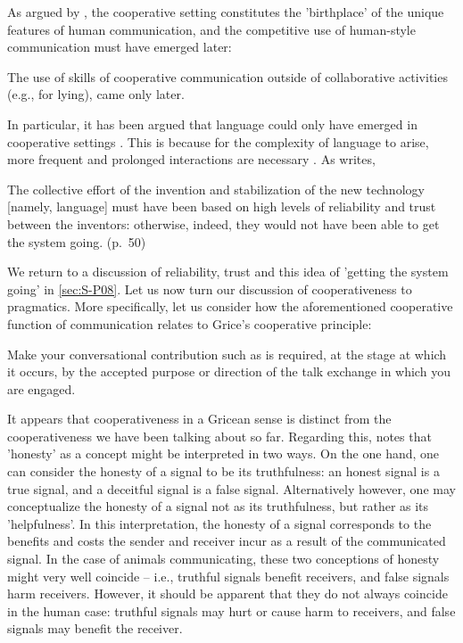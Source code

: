 As argued by \citet{Tomasello08, Tomasello09}, the cooperative setting constitutes the 'birthplace' of the unique features of human communication, and the competitive use of human-style communication must have emerged later:
\begin{quoting}
    The use of skills of cooperative communication outside of collaborative activities (e.g., for lying), came only later.
    \\ \hspace*{\fill} \citep[p.~325]{Tomasello08}
\end{quoting}
In particular, it has been argued that language could only have emerged in cooperative settings \citep{Tomasello08, Dor17}.
This is because for the complexity of language to arise, more frequent and prolonged interactions are necessary \citep{Benitez21}. As \citet{Dor17} writes,
\begin{quoting}
    The collective effort of the invention and stabilization of the new technology [namely, language] must have been based on high levels of reliability and trust between the inventors: otherwise, indeed, they would not have been able to get the system going.
    \hfill (p.~50)
\end{quoting}
We return to a discussion of reliability, trust and this idea of 'getting the system going' in \cref{sec:S-P08}.
Let us now turn our discussion of cooperativeness to pragmatics. More specifically, let us consider how the aforementioned cooperative function of communication relates to Grice's cooperative principle:
\begin{quoting}
    Make your conversational contribution such as is required, at the stage at which it occurs, by the accepted purpose or direction of the talk exchange in which you are engaged.
    \hfill \citep[p.~45]{Grice75}
\end{quoting}
It appears that cooperativeness in a Gricean sense is distinct from the cooperativeness we have been talking about so far.
Regarding this, \citet{Dor17} notes that 'honesty' as a concept might be interpreted in two ways. On the one hand, one can consider the honesty of a signal to be its truthfulness: an honest signal is a true signal, and a deceitful signal is a false signal. Alternatively however, one may conceptualize the honesty of a signal not as its truthfulness, but rather as its 'helpfulness'. In this interpretation, the honesty of a signal corresponds to the benefits and costs the sender and receiver incur as a result of the communicated signal. In the case of animals communicating, these two conceptions of honesty might very well coincide -- i.e., truthful signals benefit receivers, and false signals harm receivers. However, it should be apparent that they do not always coincide in the human case: truthful signals may hurt or cause harm to receivers, and false signals may benefit the receiver.

